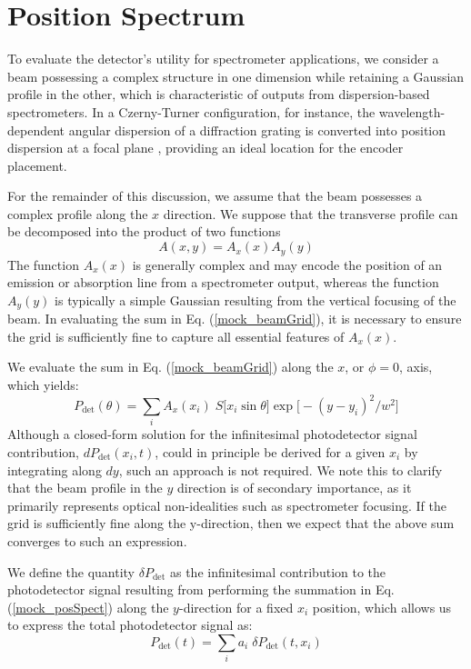 \documentclass[12pt]{report}
\begin{document}
	
	\section{Position Spectrum}
	
	To evaluate the detector's utility for spectrometer applications, we consider a beam possessing a complex structure in one dimension while retaining a Gaussian profile in the other, which is characteristic of outputs from dispersion-based spectrometers. In a Czerny-Turner configuration, for instance, the wavelength-dependent angular dispersion of a diffraction grating is converted into position dispersion at a focal plane \cite{book_demtroder_2_experimental}, providing an ideal location for the encoder placement.
	
	For the remainder of this discussion, we assume that the beam possesses a complex profile along the $x$ direction. We suppose that the transverse profile can be decomposed into the product of two functions
	\begin{equation}
		A(x,y) = A_x(x) A_y(y)
	\end{equation}
	The function $A_x(x)$ is generally complex and may encode the position of an emission or absorption line from a spectrometer output, whereas the function $A_y(y)$ is typically a simple Gaussian resulting from the vertical focusing of the beam. In evaluating the sum in Eq. (\ref{mock_beamGrid}), it is necessary to ensure the grid is sufficiently fine to capture all essential features of $A_x(x)$.
	
	We evaluate the sum in Eq. (\ref{mock_beamGrid}) along the $x$, or $\phi=0$, axis, which yields:
	\begin{equation} \label{mock_posSpect}
		P_\mathrm{det}(\theta) = \sum_i A_x(x_i) \; S\Big[ x_i \sin\theta \Big] \exp\Big[-(y-y_i)^2 / w^2\Big]
	\end{equation}
	Although a closed-form solution for the infinitesimal photodetector signal contribution, $dP_\mathrm{det}(x_i, t)$, could in principle be derived for a given $x_i$ by integrating along $dy$, such an approach is not required. We note this to clarify that the beam profile in the $y$ direction is of secondary importance, as it primarily represents optical non-idealities such as spectrometer focusing. If the grid is sufficiently fine along the y-direction, then we expect that the above sum converges to such an expression.
	
	We define the quantity $\delta P_\mathrm{det}$ as the infinitesimal contribution to the photodetector signal resulting from performing the summation in Eq. (\ref{mock_posSpect}) along the $y$-direction for a fixed $x_i$ position, which allows us to express the total photodetector signal as:
	\begin{equation} \label{mock_x_beamlet}
		P_\mathrm{det}(t) = \sum_i a_i \; \delta P_\mathrm{det}(t, x_i)
	\end{equation}
	
\end{document}
